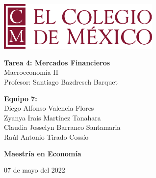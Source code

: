 \begin{titlepage}
   \begin{center}
       \vspace*{1cm}
      
        \includegraphics[width=0.6\textwidth]{COLMEX.png}
        
        \vspace*{1cm}

       \textbf{Tarea 4: Mercados Financieros} \\
        Macroeconomía II \\
        \vspace{0.5cm}
        Profesor: Santiago Bazdresch Barquet
            
       \vspace{1.5cm}

       \textbf{Equipo 7:} \\
       \vspace{0.5cm}
       Diego Alfonso Valencia Flores\\
       Zyanya Irais Martínez Tanahara\\
       Claudia Josselyn Barranco Santamaria\\
       Raúl Antonio Tirado Cossío\\ 
       
       

       \vspace{1.5cm}
            
       \textbf{Maestría en Economía}\\
            
       \vspace{0.8cm}
     
            
        07 de mayo del 2022
            
   \end{center}
\end{titlepage}
